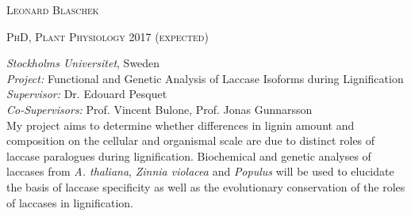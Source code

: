 \documentclass[11pt]{article}
\begin{document}
	\setlength\parindent{15pt}
\begin{center}
	\huge{\textsc{Leonard Blaschek}}
	\vspace*{0.2cm}
\end{center}

\vspace{0.1cm}

\textsc{\large{PhD, Plant Physiology} \hfill \textsc{2017 \textnormal{(expected)}}}
\begin{addmargin}[24pt]{0pt}
	\textit{Stockholms Universitet}, Sweden \\
	\textit{Project:} Functional and Genetic Analysis of Laccase Isoforms during Lignification \\
	\textit{Supervisor:} Dr. Edouard Pesquet \\
	\textit{Co-Supervisors:} Prof. Vincent Bulone, Prof. Jonas Gunnarsson
	\vspace{0.1cm} \\
	\small{My project aims to determine whether differences in lignin amount and composition on the cellular and organismal scale are due to distinct roles of laccase paralogues during lignification. Biochemical and genetic analyses of laccases from \textit{A. thaliana}, \textit{Zinnia violacea} and \textit{Populus} will be used to elucidate the basis of laccase specificity as well as the evolutionary conservation of the roles of laccases in lignification.}
\end{addmargin}
\vspace{0.2cm}
\end{document}
